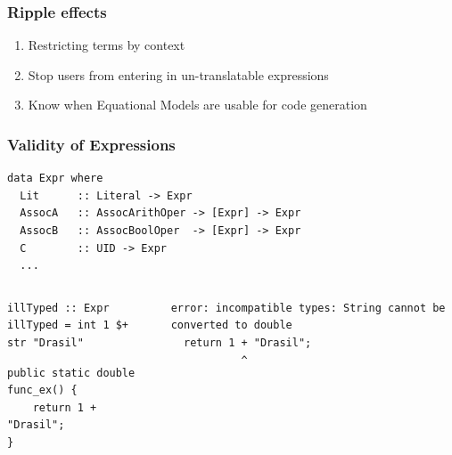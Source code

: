 \documentclass[xcolor={dvipsnames}]{beamer}
\begin{document}
\begin{frame}
  \frametitle{Ripple effects}

  \begin{enumerate}
    \item Restricting terms by context
    \item Stop users from entering in un-translatable expressions
    \item Know when Equational Models are usable for code generation
  \end{enumerate}

\end{frame}

\begin{frame}[fragile]
  \frametitle{Validity of Expressions}

\begin{verbatim}
data Expr where
  Lit      :: Literal -> Expr
  AssocA   :: AssocArithOper -> [Expr] -> Expr
  AssocB   :: AssocBoolOper  -> [Expr] -> Expr
  C        :: UID -> Expr
  ...
\end{verbatim}

\begin{columns}
  \begin{column}{0.575\textwidth}
    \begin{verbatim}
illTyped :: Expr
illTyped = int 1 $+ str "Drasil"
    \end{verbatim}
    \vspace{0.5em}
    \begin{verbatim}
public static double func_ex() {
    return 1 + "Drasil";
}
    \end{verbatim}
  \end{column}
  \hfill
  \begin{column}{0.375\textwidth}
    \begin{verbatim}
error: incompatible types: String cannot be converted to double
  return 1 + "Drasil";
           ^
    \end{verbatim}
  \end{column}
\end{columns}

\end{frame}
\end{document}
